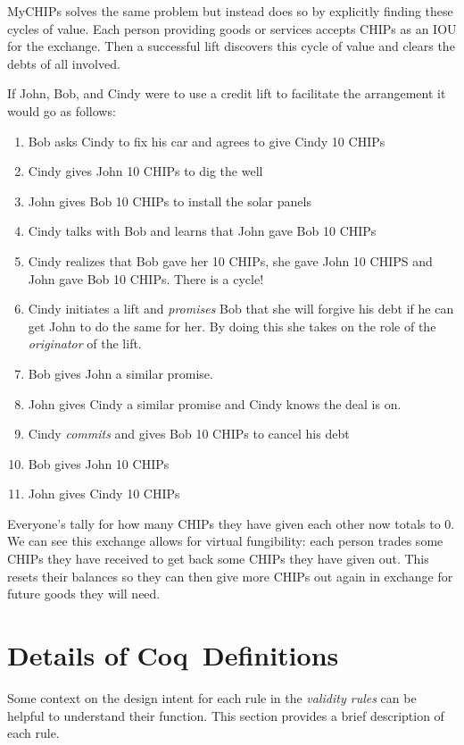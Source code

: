 \documentclass[runningheads]{llncs}
\newcommand{\coq}{Coq}
\begin{document}
MyCHIPs solves the same problem but instead does so by explicitly finding these cycles of value. Each person providing goods or services accepts CHIPs as an IOU for the exchange. Then a successful lift discovers this cycle of value and clears the debts of all involved.

If John, Bob, and Cindy were to use a credit lift to facilitate the arrangement it would go as follows:
\begin{enumerate}
\item Bob asks Cindy to fix his car and agrees to give Cindy 10 CHIPs 
\item Cindy gives John 10 CHIPs to dig the well
\item John gives Bob 10 CHIPs to install the solar panels
\item Cindy talks with Bob and learns that John gave Bob 10 CHIPs
\item Cindy realizes that Bob gave her 10 CHIPs, she gave John 10 CHIPS and John gave Bob 10 CHIPs. There is a cycle!
\item Cindy initiates a lift and \emph{promises} Bob that she will forgive his debt if he can get John to do the same for her. By doing this she takes on the role of the \emph{originator} of the lift. 
\item Bob gives John a similar promise.
\item John gives Cindy a similar promise and Cindy knows the deal is on.
\item Cindy \emph{commits} and gives Bob 10 CHIPs to cancel his debt
\item Bob gives John 10 CHIPs
\item John gives Cindy 10 CHIPs
\end{enumerate}
Everyone's tally for how many CHIPs they have given each other now totals to 0.
We can see this exchange allows for virtual fungibility: each person trades some CHIPs they have received to get back some CHIPs they have given out. 
This resets their balances so they can then give more CHIPs out again in exchange for future goods they will need. 

\section{Details of \coq\ Definitions}\label{apdx:coq_detail}

Some context on the design intent for each rule in the \emph{validity rules} can be helpful to understand their function. This section provides a brief description of each rule. 
\end{document}
